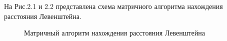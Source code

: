 \documentclass[a4paper,12pt]{report}
\begin{document}
\hspace{0.6cm}На Рис.2.1 и 2.2 представлена схема матричного алгоритма нахождения расстояния Левенштейна.
\begin{figure}[ht!]
\caption{Матричный алгоритм нахождения расстояния Левенштейна}
\end{figure}
\newpage
\end{document}
